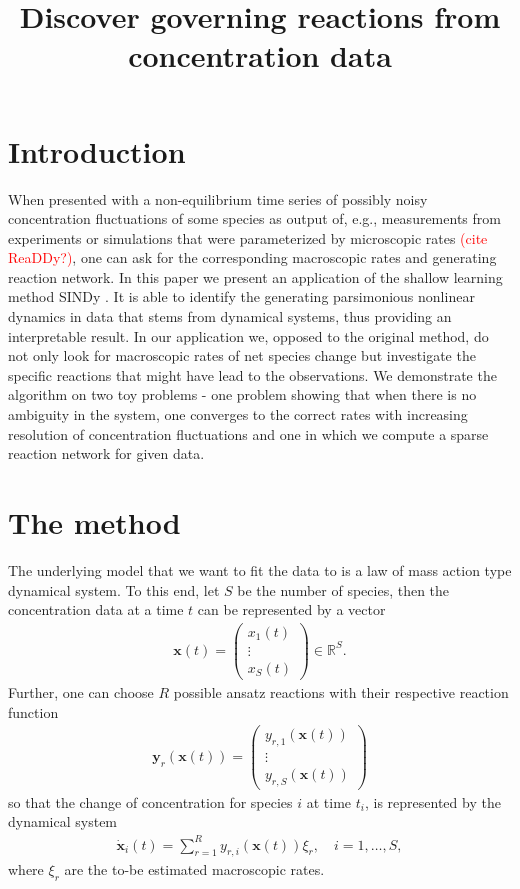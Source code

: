 \documentclass[oneside, abstracton, titlepage]{scrartcl}
\begin{document}
	\title{Discover governing reactions from concentration data}
	\maketitle
	
	\section{Introduction}
	When presented with a non-equilibrium time series of possibly noisy concentration fluctuations of some species as output of, e.g., measurements from experiments or simulations that were parameterized by microscopic rates \textcolor{red}{(cite ReaDDy?)}, one can ask for the corresponding macroscopic rates and generating reaction network. 
	In this paper we present an application of the shallow learning method SINDy \cite{Brunton2015}. It is able to identify the generating parsimonious nonlinear dynamics in data that stems from dynamical systems, thus providing an interpretable result.
	In our application we, opposed to the original method, do not only look for macroscopic rates of net species change but investigate the specific reactions that might have lead to the observations.
	We demonstrate the algorithm on two toy problems - one problem showing that when there is no ambiguity in the system, one converges to the correct rates with increasing resolution of concentration fluctuations and one in which we compute a sparse reaction network for given data.
	
	\section{The method}
	The underlying model that we want to fit the data to is a law of mass action type dynamical system. To this end, let $S$ be the number of species, then the concentration data at a time $t$ can be represented by a vector
	\begin{align}
	\mathbf{x}(t)=\begin{pmatrix}
	x_1(t)\\ \vdots \\ x_S(t)
	\end{pmatrix}\in \mathbb{R}^S.
	\end{align}
	Further, one can choose $R$ possible ansatz reactions with their respective reaction function
	\begin{align}
	\textbf{y}_r(\textbf{x}(t))=\begin{pmatrix}
	y_{r,1}(\textbf{x}(t)) \\ \vdots \\ y_{r,S}(\textbf{x}(t))
	\end{pmatrix}
	\end{align}
	so that the change of concentration for species $i$ at time $t_i$, is represented by the dynamical system
	\begin{align}
	\dot{\textbf{x}}_i(t) = \sum_{r=1}^{R}y_{r,i}(\textbf{x}(t))\xi_r,\quad i=1,\ldots, S,
	\end{align}
	where $\xi_r$ are the to-be estimated macroscopic rates.
	
\end{document}
